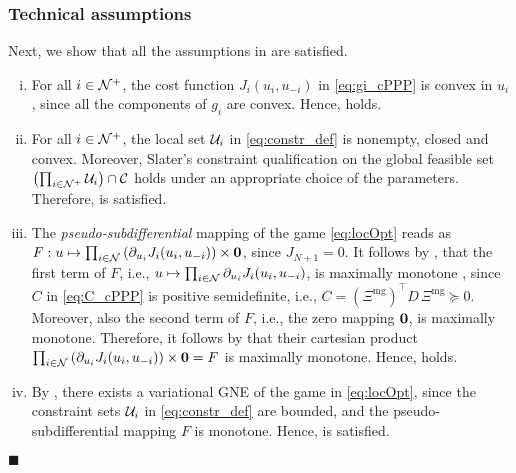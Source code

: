 \subsubsection*{Technical assumptions} Next, we show that all the assumptions in \cite[Theorem~2]{belgioioso2020semi} are satisfied.
\begin{enumerate}[(i)]
	\item For all $i \in \mathcal N^+$, the cost function $J_i(u_i, u_{-i})$ in \eqref{eq:gi_cPPP} is convex in $u_i$, since all the components of $g_i$ are convex. Hence, \cite[Assumption~1]{belgioioso2020semi} holds.
	\item For all $i \in \mathcal N^+$, the local set $\mathcal U_i$ in \eqref{eq:constr_def} is nonempty, closed and convex. Moreover, Slater's constraint qualification on the global feasible set $\left( \prod_{i \in \mathcal N^+} \mathcal U_i \right) \cap \mathcal C$ holds under an appropriate choice of the parameters. Therefore, \cite[Assumption~2]{belgioioso2020semi} is satisfied.
	\item The \textit{pseudo-subdifferential} mapping of the game \eqref{eq:locOpt} reads as $F: u \mapsto \prod_{i \in \mathcal N}\left(\partial_{u_i} J_i(u_i, u_{-i})\right)\times \mathbf{0}$, since $J_{N+1}=0$. It follows by \cite[Corollary~1]{belgioioso2017convexity}, that the first term of $F$, i.e., $u \mapsto \prod_{i \in \mathcal N}\partial_{u_i} J_i(u_i, u_{-i})$, is maximally monotone \cite[Definition~20.20]{bauschke2011convex}, since  $C$ in \eqref{eq:C_cPPP} is positive semidefinite, i.e., $C=(\Xi^{\text{mg}})^\top D \, \Xi^{\text{mg}} \succeq 0$. Moreover, also the second term of $F$, i.e., the zero mapping $\mathbf{0}$, is maximally monotone. Therefore, it follows by \cite[Proposition~20.23]{bauschke2011convex} that their cartesian product $\prod_{i \in \mathcal N}\left(\partial_{u_i} J_i(u_i, u_{-i})\right)\times \mathbf{0} = F$ is maximally monotone. Hence, \cite[Assumption~6]{belgioioso2020semi} holds.
	\item By \cite[Lemma~1~(i)]{belgioioso2020semi}, there exists a variational GNE of the game in \eqref{eq:locOpt}, since the constraint sets $\mathcal U_i$ in \eqref{eq:constr_def} are bounded, and the pseudo-subdifferential mapping $F$ is monotone. Hence, \cite[Assumption~4]{belgioioso2020semi} is satisfied.
\end{enumerate} 
{\hfill $\blacksquare$}


